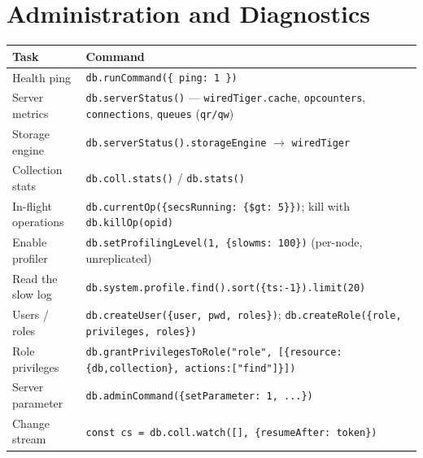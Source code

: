 \section{Administration and Diagnostics}
%
\begin{center}
\footnotesize
\begin{tabular}{@{}p{5.4cm}p{7.4cm}@{}}
\toprule
\textbf{Task} & \textbf{Command} \\
\midrule
Health ping & \texttt{db.runCommand(\{ ping: 1 \})} \\
Server metrics & \texttt{db.serverStatus()} --- \texttt{wiredTiger.cache}, \texttt{opcounters}, \texttt{connections}, \texttt{queues} (\texttt{qr/qw}) \\
Storage engine & \texttt{db.serverStatus().storageEngine} $\to$ \texttt{wiredTiger} \\
Collection stats & \texttt{db.coll.stats()} / \texttt{db.stats()} \\
In-flight operations & \texttt{db.currentOp(\{secsRunning: \{\$gt: 5\}\})}; kill with \texttt{db.killOp(opid)} \\
Enable profiler & \texttt{db.setProfilingLevel(1, \{slowms: 100\})} (per-node, unreplicated) \\
Read the slow log & \texttt{db.system.profile.find().sort(\{ts:-1\}).limit(20)} \\
Users / roles & \texttt{db.createUser(\{user, pwd, roles\})}; \texttt{db.createRole(\{role, privileges, roles\})} \\
Role privileges & \texttt{db.grantPrivilegesToRole("role", [\{resource:\{db,collection\}, actions:["find"]\}])} \\
Server parameter & \texttt{db.adminCommand(\{setParameter: 1, ...\})} \\
Change stream & \texttt{const cs = db.coll.watch([], \{resumeAfter: token\})} \\
\bottomrule
\end{tabular}
\end{center}

